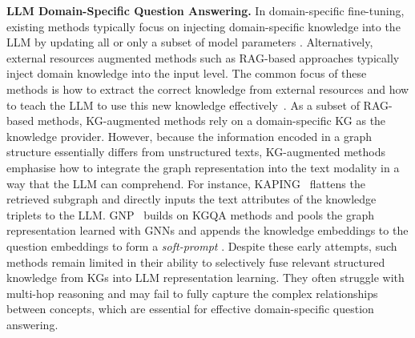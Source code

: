 
\textbf{LLM Domain-Specific Question Answering. }
In domain-specific fine-tuning, existing methods typically focus on injecting domain-specific knowledge into the LLM by updating all or only a subset of model parameters \parencite{pmc-llama, medalpaca, llava-med}. 
Alternatively, external resources augmented methods such as RAG-based approaches typically inject domain knowledge into the input level.
The common focus of these methods is how to extract the correct knowledge from external resources and how to teach the LLM to use this new knowledge effectively~\parencite {knowpat, radit}. 
As a subset of RAG-based methods, KG-augmented methods rely on a domain-specific KG as the knowledge provider.
However, because the information encoded in a graph structure essentially differs from unstructured texts, KG-augmented methods emphasise how to integrate the graph representation into the text modality in a way that the LLM can comprehend. 
For instance, KAPING~\parencite{kalm-prompting} flattens the retrieved subgraph and directly inputs the text attributes of the knowledge triplets to the LLM. GNP~\parencite{gnp} builds on KGQA methods and pools the graph representation learned with GNNs and appends the knowledge embeddings to the question embeddings to form a \emph{soft-prompt} \parencite{prompt-tuning}. Despite these early attempts, such methods remain limited in their ability to selectively fuse relevant structured knowledge from KGs into LLM representation learning. They often struggle with multi-hop reasoning and may fail to fully capture the complex relationships between concepts, which are essential for effective domain-specific question answering. 

